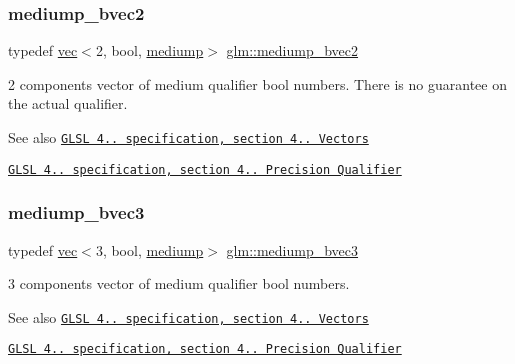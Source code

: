 \subsubsection{\texorpdfstring{mediump\+\_\+bvec2}{mediump\_bvec2}}
{\footnotesize\ttfamily typedef \hyperlink{structglm_1_1vec}{vec}$<$2, bool, \hyperlink{namespaceglm_a36ed105b07c7746804d7fdc7cc90ff25a6416f3ea0c9025fb21ed50c4d6620482}{mediump}$>$ \hyperlink{group__core__precision_ga84008d451452ffe0f6c8f395fd61a8df}{glm\+::mediump\+\_\+bvec2}}

2 components vector of medium qualifier bool numbers. There is no guarantee on the actual qualifier.

\begin{DoxySeeAlso}{See also}
\href{http://www.opengl.org/registry/doc/GLSLangSpec.4.20.8.pdf}{\tt G\+L\+SL 4.. specification, section 4.. Vectors} 

\href{http://www.opengl.org/registry/doc/GLSLangSpec.4.20.8.pdf}{\tt G\+L\+SL 4.. specification, section 4.. Precision Qualifier} 
\end{DoxySeeAlso}
\mbox{\label{group__core__precision_ga40b0d98c1fef52b1f6f6736c7223e317}} 
\subsubsection{\texorpdfstring{mediump\+\_\+bvec3}{mediump\_bvec3}}
{\footnotesize\ttfamily typedef \hyperlink{structglm_1_1vec}{vec}$<$3, bool, \hyperlink{namespaceglm_a36ed105b07c7746804d7fdc7cc90ff25a6416f3ea0c9025fb21ed50c4d6620482}{mediump}$>$ \hyperlink{group__core__precision_ga40b0d98c1fef52b1f6f6736c7223e317}{glm\+::mediump\+\_\+bvec3}}

3 components vector of medium qualifier bool numbers.

\begin{DoxySeeAlso}{See also}
\href{http://www.opengl.org/registry/doc/GLSLangSpec.4.20.8.pdf}{\tt G\+L\+SL 4.. specification, section 4.. Vectors} 

\href{http://www.opengl.org/registry/doc/GLSLangSpec.4.20.8.pdf}{\tt G\+L\+SL 4.. specification, section 4.. Precision Qualifier} 
\end{DoxySeeAlso}
\mbox{\label{group__core__precision_ga064ca037c066a4d47ab6d34c2cf0ae2f}} 
